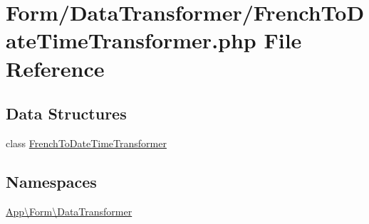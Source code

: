\hypertarget{_french_to_date_time_transformer_8php}{}\section{Form/\+Data\+Transformer/\+French\+To\+Date\+Time\+Transformer.php File Reference}
\label{_french_to_date_time_transformer_8php}
\subsection*{Data Structures}
\begin{DoxyCompactItemize}
\item 
class \mbox{\hyperlink{class_app_1_1_form_1_1_data_transformer_1_1_french_to_date_time_transformer}{French\+To\+Date\+Time\+Transformer}}
\end{DoxyCompactItemize}
\subsection*{Namespaces}
\begin{DoxyCompactItemize}
\item 
 \mbox{\hyperlink{namespace_app_1_1_form_1_1_data_transformer}{App\textbackslash{}\+Form\textbackslash{}\+Data\+Transformer}}
\end{DoxyCompactItemize}
